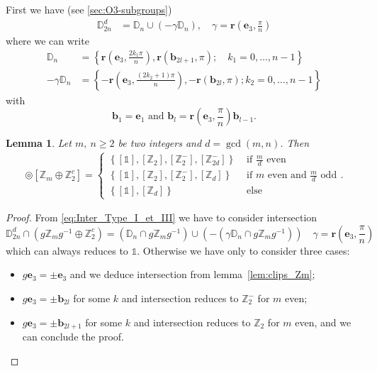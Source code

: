\documentclass[11pt,a4paper]{amsart}
\newtheorem{lem}[thm]{Lemma}
\theoremstyle{definition}
\newcommand{\ZZ}{\mathbb{Z}}                %
\newcommand{\DD}{\mathbb{D}}                %
\newcommand{\1}{\mathds{1}}		            %
\newcommand{\ee}{\pmb{e}}                   %
\newcommand{\vR}{\mathbf{r}}
\newcommand{\be}{\mathbf{e}}
\newcommand{\bb}{\mathbf{b}}
\newcommand{\set}[1]{\left\{#1\right\}}     %
\newcommand{\Dnd}{\DD_{2n}^d}
\begin{document}
First we have (see \autoref{sec:O3-subgroups})
\begin{align*}
  \Dnd & =\DD_n\cup (-\gamma \DD_n),\quad \gamma=\vR\left(\ee_3,\frac{\pi}{n}\right)
\end{align*}
where we can write
\begin{align}
   \DD_n         & =\set{\vR\left(\ee_3,\frac{2k_1\pi}{n}\right),\vR(\bb_{2l+1},\pi);\quad k_1=0,\dotsc,n-1}   \\
 \label{eq:gammaDn} -\gamma \DD_n & =\set{-\vR\left(\ee_3,\frac{(2k_2+1)\pi}{n}\right),-\vR(\bb_{2l},\pi);k_2=0,\dotsc,n-1}
\end{align}
with
\begin{equation}\label{eq:Secon_Axe_D2nm}
  \bb_1=\ee_1 \text{ and } \bb_l=\vR\left(\ee_3,\frac{\pi}{n}\right)\bb_{l-1}.
\end{equation}

\begin{lem}\label{lem:D2nhclipsZm}
  Let $m,\ n \geq 2$ be two integers and $d=\gcd(m,n)$. Then
  \begin{align*}
    [\Dnd] \circledcirc [\ZZ_m \oplus \ZZ_2^c]=
    \begin{cases}
      \set{[\1],[\ZZ_2],[\ZZ_{2}^-],[\ZZ_{2d}^-]} & \text{ if $\frac{m}{d}$ even}             \\
      \set{[\1],[\ZZ_2],[\ZZ_{2}^-],[\ZZ_{d}]}    & \text{ if $m$ even and $\frac{m}{d}$ odd} \\
      \set{[\1],[\ZZ_d]}                          & \text{ else}
    \end{cases}.
  \end{align*}
\end{lem}

\begin{proof}
  From \eqref{eq:Inter_Type_I_et_III} we have to consider intersection
  \begin{equation*}
    \Dnd \cap (g\ZZ_m g^{-1} \oplus \ZZ_2^c)=(\DD_n\cap g \ZZ_m g^{-1})\cup (-(\gamma\DD_n\cap g \ZZ_m g^{-1}))\quad \gamma=\vR\left(\ee_3,\frac{\pi}{n}\right)
  \end{equation*}
  which can always reduces to $\1$. Otherwise we have only to consider three cases:
  \begin{itemize}
    \item $g\be_3=\pm\be_3$ and we deduce intersection from lemma~\ref{lem:clips_Zm};
    \item $g\be_3=\pm\bb_{2l}$ for some $k$ and intersection reduces to $\ZZ_2^-$ for $m$ even;
    \item $g\be_3=\pm\bb_{2l+1}$ for some $k$ and intersection reduces to $\ZZ_2$ for $m$ even, and we can conclude the proof.
  \end{itemize}
\end{proof}
\end{document}
